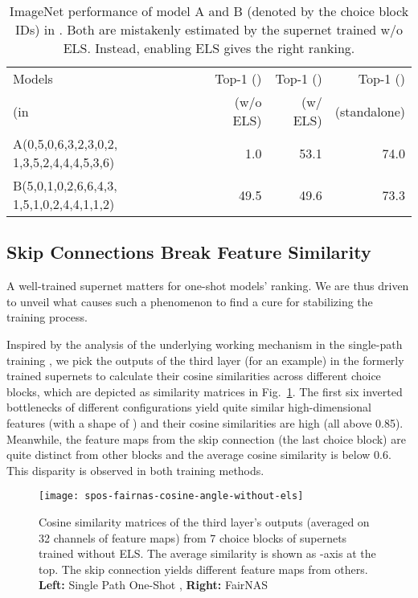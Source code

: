 \documentclass[10pt,twocolumn,letterpaper]{article}
\theoremstyle{definition}
\begin{document}
\setlength{\tabcolsep}{4pt}
\begin{table}
	\centering
\begin{tabular}{|p{2.6cm}*{3}{|r}|}
		\hline
		  Models   & Top-1 ()  & Top-1 () & Top-1 ()  \\
		 (in &(w/o ELS)&(w/ ELS)& (standalone)
		\\
		\hline
		A(0,5,0,6,3,2,3,0,2, 1,3,5,2,4,4,4,5,3,6) & 1.0  & 53.1 & 74.0\\
		\hline
		B(5,0,1,0,2,6,6,4,3, 1,5,1,0,2,4,4,1,1,2) & 49.5&49.6 & 73.3 \\
		\hline
	\end{tabular}
	\caption{ImageNet performance of model A and B (denoted by the choice block IDs) in . Both are mistakenly estimated by the supernet trained w/o ELS. Instead, enabling ELS gives the right ranking.}
	\label{fig:underest-overest}
\end{table}


\subsection{Skip Connections Break Feature Similarity}

A well-trained supernet matters for one-shot models' ranking. We are thus driven to unveil what causes such a phenomenon to find a cure for stabilizing the training process. 

Inspired by the analysis of the underlying working mechanism in the single-path training \cite{chu2019fairnas}, we pick the outputs of the third layer (for an example) in the formerly trained supernets to calculate their cosine similarities across different choice blocks, which are depicted as  similarity matrices in Fig.~\ref{fig:spos-fairnas-cosine-angle-3rd-no-els}.  The first six inverted bottlenecks of different configurations yield quite similar high-dimensional features (with a shape of ) and their cosine similarities are high (all above 0.85). Meanwhile, the feature maps from the skip connection (the last choice block) are quite distinct from other blocks and the average cosine similarity is below 0.6.  This disparity is observed in both training methods. 

\begin{figure}[ht]
\centering
\texttt{[image: spos-fairnas-cosine-angle-without-els]}
\caption{Cosine similarity matrices of the third layer's outputs (averaged on 32 channels of  feature maps) from 7 choice blocks of supernets trained without ELS. The average similarity is shown as -axis at the top. The skip connection yields different feature maps from others. \textbf{Left:} Single Path One-Shot \protect\cite{guo2019single}, \textbf{Right:} FairNAS \protect\cite{chu2019fairnas}}
\label{fig:spos-fairnas-cosine-angle-3rd-no-els}
\end{figure} 
\end{document}

